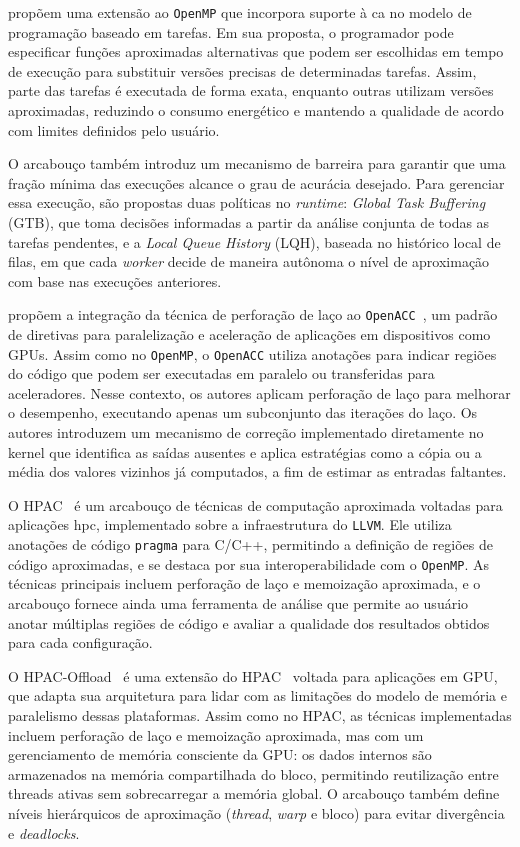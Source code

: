 \citet{vassiliadis2015} propõem uma extensão ao \texttt{OpenMP} que incorpora suporte à \gls{ca} no modelo de programação baseado em tarefas. Em sua proposta, o programador pode especificar funções aproximadas alternativas que podem ser escolhidas em tempo de execução para substituir versões precisas de determinadas tarefas. Assim, parte das tarefas é executada de forma exata, enquanto outras utilizam versões aproximadas, reduzindo o consumo energético e mantendo a qualidade de acordo com limites definidos pelo usuário.

O arcabouço também introduz um mecanismo de barreira para garantir que uma fração mínima das execuções alcance o grau de acurácia desejado. Para gerenciar essa execução, são propostas duas políticas no \textit{runtime}: \textit{Global Task Buffering} (GTB), que toma decisões informadas a partir da análise conjunta de todas as tarefas pendentes, e a \textit{Local Queue History} (LQH), baseada no histórico local de filas, em que cada \textit{worker} decide de maneira autônoma o nível de aproximação com base nas execuções anteriores.

\citet{lashgar2018} propõem a integração da técnica de perforação de laço ao \texttt{OpenACC}~\cite{openacc33}, um padrão de diretivas para paralelização e aceleração de aplicações em dispositivos como GPUs. Assim como no \texttt{OpenMP}, o \texttt{OpenACC} utiliza anotações para indicar regiões do código que podem ser executadas em paralelo ou transferidas para aceleradores. Nesse contexto, os autores aplicam perforação de laço para melhorar o desempenho, executando apenas um subconjunto das iterações do laço. Os autores introduzem um mecanismo de correção implementado diretamente no kernel que identifica as saídas ausentes e aplica estratégias como a cópia ou a média dos valores vizinhos já computados, a fim de estimar as entradas faltantes.

O HPAC~\cite{parasyris2021} é um arcabouço de técnicas de computação aproximada voltadas para aplicações \gls{hpc}, implementado sobre a infraestrutura do \texttt{LLVM}. Ele utiliza anotações de código \texttt{pragma} para C/C++, permitindo a definição de regiões de código aproximadas, e se destaca por sua interoperabilidade com o \texttt{OpenMP}. As técnicas principais incluem perforação de laço e memoização aproximada, e o arcabouço fornece ainda uma ferramenta de análise que permite ao usuário anotar múltiplas regiões de código e avaliar a qualidade dos resultados obtidos para cada configuração.

O HPAC-Offload~\cite{fink2023} é uma extensão do HPAC~\cite{parasyris2021} voltada para aplicações em GPU, que adapta sua arquitetura para lidar com as limitações do modelo de memória e paralelismo dessas plataformas. Assim como no HPAC, as técnicas implementadas incluem perforação de laço e memoização aproximada, mas com um gerenciamento de memória consciente da GPU: os dados internos são armazenados na memória compartilhada do bloco, permitindo reutilização entre threads ativas sem sobrecarregar a memória global. O arcabouço também define níveis hierárquicos de aproximação (\textit{thread}, \textit{warp} e bloco) para evitar divergência e \textit{deadlocks}.

